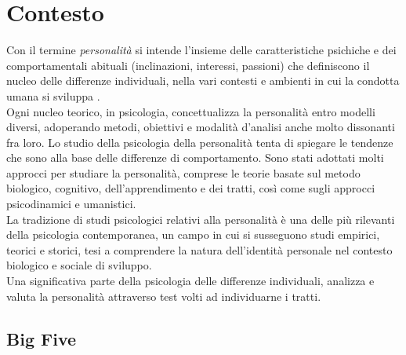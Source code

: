 \chapter{Contesto}
\label{chap:contesto}

Con il termine \emph{personalità} si intende l'insieme delle caratteristiche psichiche e dei comportamentali abituali (inclinazioni, interessi, passioni) che definiscono il nucleo delle differenze individuali, nella vari contesti e ambienti in cui la condotta umana si sviluppa \cite{corr2009cambridge,sadock2000comprehensive}.
\\
Ogni nucleo teorico, in psicologia, concettualizza la personalità entro modelli diversi, adoperando metodi, obiettivi e modalità d'analisi anche molto dissonanti fra loro. 
Lo studio della psicologia della personalità tenta di spiegare le tendenze che sono alla base delle differenze di comportamento. Sono stati adottati molti approcci per studiare la personalità, comprese le teorie basate sul metodo biologico, cognitivo, dell'apprendimento e dei tratti, così come sugli approcci psicodinamici e umanistici. 
\\
La tradizione di studi psicologici relativi alla personalità è una delle più rilevanti della psicologia contemporanea, un campo in cui si susseguono studi empirici, teorici e storici, tesi a comprendere la natura dell'identità personale nel contesto biologico e sociale di sviluppo. \\
Una significativa parte della psicologia delle differenze individuali, analizza e valuta la personalità attraverso test volti ad individuarne i tratti.

\section{Big Five}
\label{sec:big5}

